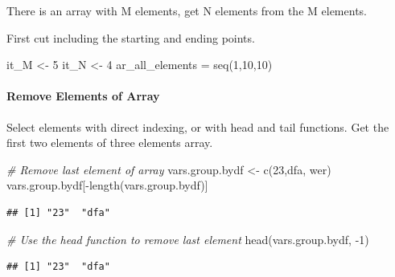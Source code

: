 \documentclass[
]{book}
\newenvironment{Shaded}{\begin{snugshade}}{\end{snugshade}}
\newcommand{\CommentTok}[1]{\textcolor[rgb]{0.56,0.35,0.01}{\textit{#1}}}
\newcommand{\DecValTok}[1]{\textcolor[rgb]{0.00,0.00,0.81}{#1}}
\newcommand{\FunctionTok}[1]{\textcolor[rgb]{0.00,0.00,0.00}{#1}}
\newcommand{\NormalTok}[1]{#1}
\newcommand{\OtherTok}[1]{\textcolor[rgb]{0.56,0.35,0.01}{#1}}
\newcommand{\SpecialCharTok}[1]{\textcolor[rgb]{0.00,0.00,0.00}{#1}}
\newcommand{\StringTok}[1]{\textcolor[rgb]{0.31,0.60,0.02}{#1}}
\begin{document}
There is an array with M elements, get N elements from the M elements.

First cut including the starting and ending points.

\begin{Shaded}
\begin{Highlighting}[]
\NormalTok{it\_M }\OtherTok{\textless{}{-}} \DecValTok{5}
\NormalTok{it\_N }\OtherTok{\textless{}{-}} \DecValTok{4}
\NormalTok{ar\_all\_elements }\OtherTok{=} \FunctionTok{seq}\NormalTok{(}\DecValTok{1}\NormalTok{,}\DecValTok{10}\NormalTok{,}\DecValTok{10}\NormalTok{)}
\end{Highlighting}
\end{Shaded}

\hypertarget{remove-elements-of-array}{%
\paragraph{Remove Elements of Array}\label{remove-elements-of-array}}

Select elements with direct indexing, or with head and tail functions. Get the first two elements of three elements array.

\begin{Shaded}
\begin{Highlighting}[]
\CommentTok{\# Remove last element of array}
\NormalTok{vars.group.bydf }\OtherTok{\textless{}{-}} \FunctionTok{c}\NormalTok{(}\StringTok{\textquotesingle{}23\textquotesingle{}}\NormalTok{,}\StringTok{\textquotesingle{}dfa\textquotesingle{}}\NormalTok{, }\StringTok{\textquotesingle{}wer\textquotesingle{}}\NormalTok{)}
\NormalTok{vars.group.bydf[}\SpecialCharTok{{-}}\FunctionTok{length}\NormalTok{(vars.group.bydf)]}
\end{Highlighting}
\end{Shaded}

\begin{verbatim}
## [1] "23"  "dfa"
\end{verbatim}

\begin{Shaded}
\begin{Highlighting}[]
\CommentTok{\# Use the head function to remove last element}
\FunctionTok{head}\NormalTok{(vars.group.bydf, }\SpecialCharTok{{-}}\DecValTok{1}\NormalTok{)}
\end{Highlighting}
\end{Shaded}

\begin{verbatim}
## [1] "23"  "dfa"
\end{verbatim}
\end{document}
